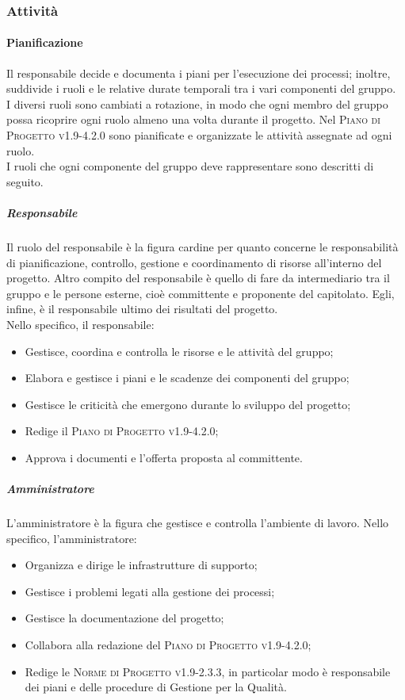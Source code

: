 \subsubsection{Attività}
\paragraph{Pianificazione}
Il responsabile decide e documenta i piani per l'esecuzione dei processi; inoltre, suddivide i ruoli e le relative durate temporali tra i vari componenti del gruppo. \\
I diversi ruoli sono cambiati a rotazione, in modo che ogni membro del gruppo possa ricoprire ogni ruolo almeno una volta durante il progetto. Nel \textsc{Piano di Progetto v1.9-4.2.0} sono pianificate e organizzate le attività assegnate ad ogni ruolo. \\
I ruoli che ogni componente del gruppo deve rappresentare sono descritti di seguito.
\subparagraph{Responsabile}
Il ruolo del responsabile è la figura cardine per quanto concerne le responsabilità di pianificazione, controllo, gestione e coordinamento di risorse all'interno del progetto. Altro compito del responsabile è quello di fare da intermediario tra il gruppo e le persone esterne, cioè committente e proponente del capitolato. Egli, infine, è il responsabile ultimo dei risultati del progetto. \\
Nello specifico, il responsabile:
\begin{itemize}
  \item Gestisce, coordina e controlla le risorse e le attività del gruppo;
  \item Elabora e gestisce i piani e le scadenze dei componenti del gruppo;
  \item Gestisce le criticità che emergono durante lo sviluppo del progetto;
  \item Redige il \textsc{Piano di Progetto v1.9-4.2.0};
  \item Approva i documenti e l'offerta proposta al committente.
\end{itemize}

\subparagraph{Amministratore}
L'amministratore è la figura che gestisce e controlla l'ambiente di lavoro. Nello specifico, l'amministratore:
\begin{itemize}
  \item Organizza e dirige le infrastrutture di supporto;
  \item Gestisce i problemi legati alla gestione dei processi;
  \item Gestisce la documentazione del progetto;
  \item Collabora alla redazione del \textsc{Piano di Progetto v1.9-4.2.0};
  \item Redige le \textsc{Norme di Progetto v1.9-2.3.3}, in particolar modo è responsabile dei piani e delle procedure di Gestione per la Qualità.
\end{itemize}

